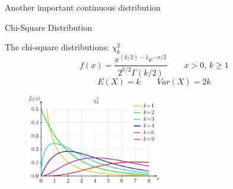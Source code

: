\documentclass{beamer}\usepackage[]{graphicx}\usepackage[]{color}
\begin{document}
% 
% 

\begin{frame}

\begin{center}
\huge{Another important continuous distribution }
\end{center}
\end{frame}

\begin{frame}{Chi-Square Distribution}

The chi-square distributions: $\chi_k^2$
$$f(x) = \frac{ x^{(k/2)-1} e^{- x/2}}{2^{k/2}\Gamma(k/2)}
  \qquad x>0,\, k\geq 1$$ \pause
$$E(X) = k \qquad Var(X) = 2k$$ \pause

\begin{center}
\includegraphics[width=8cm,height=4cm]{chi-square}
\end{center}


\end{frame}
\end{document}
